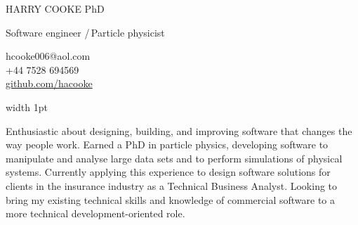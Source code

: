 \documentclass[a4paper]{article}
\newcommand\bodysize{\fontsize{11}{13}}
\newcommand\htwosize{\fontsize{12}{15}}
\newcommand\hlseptwo{{\color{hl}/}\,}
\newcommand\intersectionspacing{0.3em}
\newcommand\sidetitle[2][0em]{%
  \fontfamily{phv}\fontseries{b}\fontsize{12}{13}\selectfont\color{hl}
  \hspace{.1em}
  \rotatebox[origin=c]{90}{\hspace{#1}#2}
}
\newcommand\lefttitleblockvpad{\vspace{.3em}}
\newcommand\lefttitleblock[3]{%
  \colorbox{#1}{%
    \begin{minipage}[c]{.04\textwidth}
      \lefttitleblockvpad
      \sidetitle{#2}
      \lefttitleblockvpad
    \end{minipage}{\color{hl}\vrule width 1pt}%
    \begin{minipage}[c]{.005\textwidth}\hfill\end{minipage}
    \begin{minipage}[c]{.94\textwidth}
      \lefttitleblockvpad
      #3
      \lefttitleblockvpad
    \end{minipage}%
  }
}
\newcommand\cvtitle{HARRY COOKE\xspace}
\newcommand\cvsubtitle{
  Software engineer \hlseptwo Particle physicist
\xspace}
\begin{document}
\pagestyle{pageother}
\thispagestyle{pageone}

\begin{minipage}{\textwidth}
  \begin{minipage}[b]{0.7\textwidth}
    {\fontsize{28}{25}\selectfont\color{hl}%
      \cvtitle 
    }{\fontsize{19}{20}\selectfont%
      \hspace{5pt}PhD
    }\\[.4em]
    {\htwosize\selectfont%
      \cvsubtitle
    }
  \end{minipage}%
  \begin{minipage}[b]{0.3\textwidth}
    \raggedleft{}\bodysize\selectfont%
      hcooke006@aol.com \\[0.1em]
      +44 7528 694569 \\[0.1em]
      \href{https://github.com/hacooke}{github.com/hacooke}
  \end{minipage}
\end{minipage}

\vspace{0.5em}

\lefttitleblock{bg2}{SUMMARY}{%
    \fontseries{m}\fontshape{n}\bodysize\selectfont%
    Enthusiastic about designing, building, and improving software that changes
    the way people work. 
    Earned a PhD in particle physics, developing software to manipulate and
    analyse large data sets and to perform simulations of physical systems.
    Currently applying this experience to design software solutions for clients
    in the insurance industry as a Technical Business Analyst.
    Looking to bring my existing technical skills and knowledge of commercial
    software to a more technical development-oriented role.
}\\[\intersectionspacing]
\end{document}
